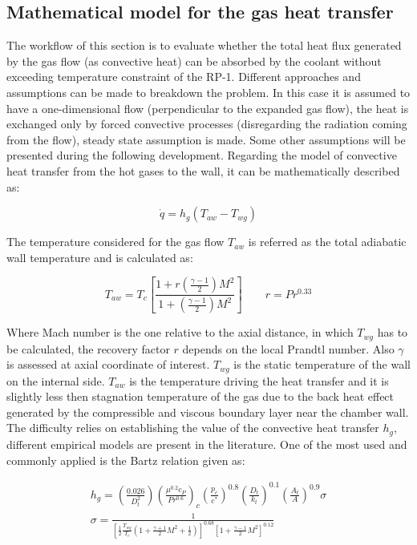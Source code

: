 \subsection{Mathematical model for the gas heat transfer}

The workflow of this section is to evaluate whether the total heat flux generated by the gas flow (as convective heat) can be absorbed by the coolant without exceeding temperature constraint of the RP-1. Different approaches and assumptions can be made to breakdown the problem. In this case it is assumed to have a one-dimensional flow (perpendicular to the expanded gas flow), the heat is exchanged only by forced convective processes (disregarding the radiation coming from the flow), steady state assumption is made. Some other assumptions will be presented during the following development.
Regarding the model of convective heat transfer from the hot gases to the wall, it can be mathematically described as:

\begin{equation}
    \dot{q} = h_g (T_{aw} - T_{wg})
\end{equation}

The temperature considered for the gas flow $T_{aw}$ is referred as the total adiabatic wall temperature and is calculated as:

\begin{equation}
    T_{aw} = T_c \left[\frac{1 + r\left(\frac{\gamma - 1}{2}\right)M^2}{1 + \left(\frac{\gamma - 1}{2}\right)M^2}\right] \qquad r = Pr^{0.33}
\end{equation}

\vspace{3mm}
Where Mach number is the one relative to the axial distance, in which $T_{wg}$ has to be calculated, the recovery factor $r$ depends on the local Prandtl number. Also $\gamma$ is assessed at axial coordinate of interest. $T_{wg}$ is the static temperature of the wall on the internal side. $T_{aw}$ is the temperature driving the heat transfer and it is slightly less then stagnation temperature of the gas due to the back heat effect generated by the compressible and viscous boundary layer near the chamber wall. The difficulty relies on establishing the value of the convective heat transfer $h_g$, different empirical models are present in the literature. One of the most used and commonly applied is the Bartz relation given as:


\begin{gather}
    h_g = \left(\frac{0.026}{D_t^2}\right) \left(\frac{\mu^{0.2} c_P}{Pr^{0.6}}\right)_{c} \left(\frac{p_c}{c^*}\right)^{0.8} \left(\frac{D_t}{k_t} \right)^{0.1} \left(\frac{A_t}{A}\right)^{0.9} \sigma
    \label{eq:h_g}
    \\[5pt]
    \sigma = \frac{1}{\left[\frac{1}{2}\frac{T_{wg}}{T_c} \left( 1 + \frac{\gamma + 1}{2}M^2 +\frac{1}{2} \right)\right]^{0.68} \left[1 + \frac{\gamma - 1}{2}M^2 \right]^{0.12}}
    \label{eq:sigma}
\end{gather}

